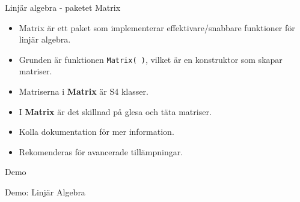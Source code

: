 \documentclass[
  11pt,
  ignorenonframetext,
  handout]{beamer}
\providecommand{\tightlist}{%
  \setlength{\itemsep}{0pt}\setlength{\parskip}{0pt}}
\begin{document}
\begin{frame}{Linjär algebra - paketet Matrix}
\label{linjuxe4r-algebra---paketet-matrix}
\begin{itemize}
\tightlist
\item
  Matrix är ett paket som implementerar effektivare/snabbare funktioner
  för linjär algebra.
\item
  Grunden är funktionen \texttt{Matrix( )}, vilket är en konstruktor som
  skapar matriser.
\item
  Matriserna i \textbf{Matrix} är S4 klasser.
\item
  I \textbf{Matrix} är det skillnad på glesa och täta matriser.
\item
  Kolla dokumentation för mer information.
\item
  Rekomenderas för avancerade tillämpningar.
\end{itemize}
\end{frame}

\begin{frame}{Demo}
\label{demo-2}
\begin{block}{Demo: Linjär Algebra}
\label{demo-linjuxe4r-algebra}
\end{block}
\end{frame}
\end{document}
